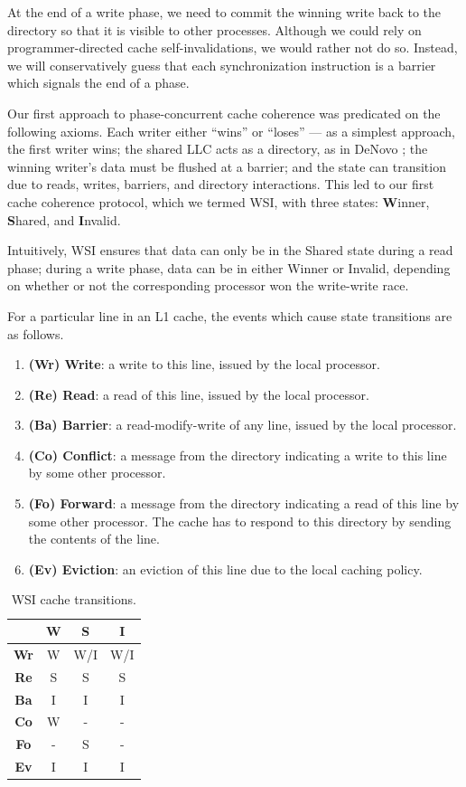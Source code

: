 \documentclass{article}
\begin{document}
At the end of a write phase, we need to commit the winning write back to the directory so that it is visible to other processes. Although we could rely on programmer-directed cache self-invalidations, we would rather not do so. Instead, we will conservatively guess that each synchronization instruction is a barrier which signals the end of a phase.

Our first approach to phase-concurrent cache coherence was predicated on the following axioms. Each writer either ``wins'' or ``loses'' --- as a simplest approach, the first writer wins; the shared LLC acts as a directory, as in DeNovo \cite{choi2010denovo}; the winning writer's data must be flushed at a barrier; and the state can transition due to reads, writes, barriers, and directory interactions. This led to our first cache coherence protocol, which we termed WSI, with three states: \textbf{W}inner, \textbf{S}hared, and \textbf{I}nvalid.

Intuitively, WSI ensures that data can only be in the Shared state during a read phase; during a write phase, data can be in either Winner or Invalid, depending on whether or not the corresponding processor won the write-write race.

For a particular line in an L1 cache, the events which cause state transitions are as follows.

\begin{enumerate}
\item \textbf{(Wr) Write}: a write to this line, issued by the local processor.
\item \textbf{(Re) Read}: a read of this line, issued by the local processor.
\item \textbf{(Ba) Barrier}: a read-modify-write of any line, issued by the local processor.
\item \textbf{(Co) Conflict}: a message from the directory indicating a write to this line by some other processor.
\item \textbf{(Fo) Forward}: a message from the directory indicating a read of this line by some other processor. The cache has to respond to this directory by sending the contents of the line.
\item \textbf{(Ev) Eviction}: an eviction of this line due to the local caching policy.
\end{enumerate}

\begin{table}[H]
\centering
\caption{WSI cache transitions.}
\label{wsi-cache-protocol}
\begin{tabular}{|c|c|c|c|}
\hline
 & \textbf{W} & \textbf{S} & \textbf{I} \\ \hline
\textbf{Wr} & W & W/I & W/I \\ \hline
\textbf{Re} & S & S & S \\ \hline
\textbf{Ba} & I & I & I \\ \hline
\textbf{Co} & W & - & - \\ \hline
\textbf{Fo} & - & S & - \\ \hline
\textbf{Ev} & I & I & I \\ \hline
\end{tabular}
\end{table}
\end{document}
